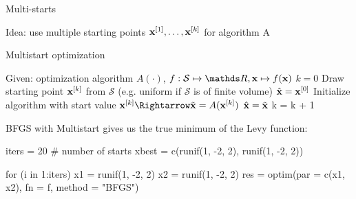 \documentclass[11pt,compress,t,notes=noshow, xcolor=table]{beamer}
\begin{document}
\begin{vbframe}{Multi-starts}
\framebreak
\normalsize








\normalsize
\framebreak

Idea: use multiple starting points $\mathbf{x}^{[1]}, \ldots, \mathbf{x}^{[k]}$ for algorithm A

\begin{algorithm}[H]
  \begin{footnotesize}
  \begin{center}
  \caption{Multistart optimization}
    \begin{algorithmic}[1]
    \State Given: optimization algorithm $A(\cdot)$, $f: \mathcal{S} \mapsto \R, \xv \mapsto f(\xv)$
    \State $k = 0$
      \Repeat
        \State Draw starting point  $\mathbf{x}^{[k]}$ from $\mathcal{S}$ (e.g. uniform if $\mathcal{S}$ is of finite volume)
          $\hat{\mathbf{x}}= \mathbf{x}^{[0]}$
        \EndIf
        \State Initialize algorithm with start value $\xv^{[k]} \Rightarrow \tilde{\xv} = A(\xv^{[k]})$
          $\hat{\mathbf{x}} = \tilde{\mathbf{x}}$
        \EndIf
        \State k = k + 1
      \\
    \Return{$\hat{\xv}$}
    \end{algorithmic}
    \end{center}
    \end{footnotesize}
\end{algorithm}

\framebreak

BFGS with Multistart gives us the true minimum of the Levy function:\\
\lz

\footnotesize
\begin{verbbox}
iters = 20 # number of starts
xbest = c(runif(1, -2, 2), runif(1, -2, 2))
\end{verbbox}
\theverbbox


\vspace{0.4cm}
\begin{verbbox}
for (i in 1:iters) {
x1 = runif(1, -2, 2)
x2 = runif(1, -2, 2)
res = optim(par = c(x1, x2), fn = f, method = "BFGS")
}
\end{verbbox}
\theverbbox


\end{vbframe}
\end{document}
